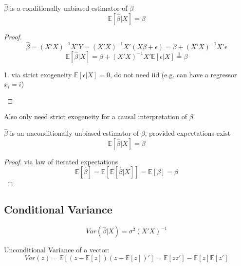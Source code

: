 \documentclass[DIV=14,titlepage=false]{scrreprt}
\begin{document}
\begin{claim}
  \(\hat{\beta}\) is a conditionally unbiased estimator of \(\beta\) \[\mathbb{E}[\hat{\beta}|X]=\beta\]
\end{claim}

\vspace{5mm}

\begin{proof}
  \[\hat{\beta}=(X'X)^{-1}X'Y = (X'X)^{-1}X'(X\beta+\epsilon)=\beta+(X'X)^{-1}X'\epsilon\]
  \[\mathbb{E}[\hat{\beta}|X]=\beta+(X'X)^{-1}X'\mathbb{E}[\epsilon|X]\operatorname*{=}^1\beta \] 
  \begin{center}
    1. via strict exogeneity \(\mathbb{E}[\epsilon|X]=0\), do not need iid (e.g. can have a regressor \(x_i=i\))
  \end{center}
\end{proof}

Also only need strict exogeneity for a causal interpretation of \(\beta\).

\vspace{5mm}

\begin{claim}
  \(\hat{\beta}\) is an unconditionally unbiased estimator of \(\beta\), provided expectations exist \[\mathbb{E}[\hat{\beta}|X]=\beta\]
\end{claim}

\vspace{5mm}

\begin{proof} via law of iterated expectations
  \[\mathbb{E}[\hat{\beta}]=\mathbb{E}[\mathbb{E}[\hat{\beta}|X]]=\mathbb{E}[\beta]=\beta\]
\end{proof}

\subsection{Conditional Variance}

\vspace{5mm}

\begin{theorem}
  \[Var(\hat{\beta}|X)=\sigma^2(X'X)^{-1}\]
\end{theorem}

\vspace{5mm}

  
\vspace{5mm}

\begin{lemma} Unconditional Variance of a vector:
  \[Var(z)=\mathbb{E}[(z-\mathbb{E}[z])(z-\mathbb{E}[z])']=\mathbb{E}[zz']-\mathbb{E}[z]\mathbb{E}[z']\]
\end{lemma}
\end{document}
